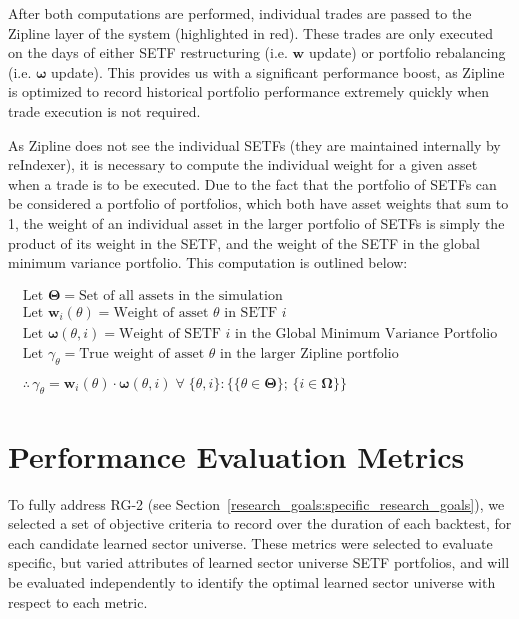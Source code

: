 \documentclass[../main.tex]{subfiles}
\begin{document}
After both computations are performed, individual trades are passed to the Zipline layer of the system (highlighted in red). These trades are only executed on the days of either SETF restructuring (i.e. $\boldsymbol{w}$ update) or portfolio rebalancing (i.e. $\boldsymbol{\omega}$ update). This provides us with a significant performance boost, as Zipline is optimized to record historical portfolio performance extremely quickly when trade execution is not required.

As Zipline does not see the individual SETFs (they are maintained internally by reIndexer), it is necessary to compute the individual weight for a given asset when a trade is to be executed. Due to the fact that the portfolio of SETFs can be considered a portfolio of portfolios, which both have asset weights that sum to 1, the weight of an individual asset in the larger portfolio of SETFs is simply the product of its weight in the SETF, and the weight of the SETF in the global minimum variance portfolio. This computation is outlined below:

\begin{gather*}
    \text{Let $\boldsymbol{\Theta}$} = \text{Set of all assets in the simulation} \\
    \text{Let $\boldsymbol{w}_i(\theta)$} = \text{Weight of asset $\theta$ in SETF $i$} \\
    \text{Let $\boldsymbol{\omega}(\theta, i)$} = \text{Weight of SETF $i$ in the Global Minimum Variance Portfolio} \\
    \text{Let $\gamma_\theta$} = \text{True weight of asset $\theta$ in the larger Zipline portfolio}
    \\
    \\
    \therefore \, \gamma_\theta = \boldsymbol{w}_i(\theta) \cdot \boldsymbol{\omega}(\theta, i) \; \forall \; \{ \theta, i \} : \{ \{ \theta \in \boldsymbol{\Theta} \} ; \, \{ i \in \boldsymbol{\Omega} \} \}
\end{gather*}



\section{Performance Evaluation Metrics}

To fully address RG-2 (see Section~\ref{research_goals:specific_research_goals}), we selected a set of objective criteria to record over the duration of each backtest, for each candidate learned sector universe. These metrics were selected to evaluate specific, but varied attributes of learned sector universe SETF portfolios, and will be evaluated independently to identify the optimal learned sector universe with respect to each metric.
\end{document}
